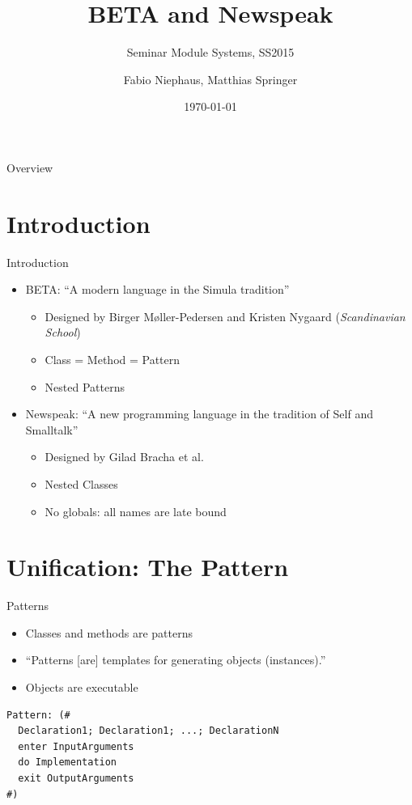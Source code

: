 \documentclass[xcolor=dvipsname,handout]{beamer} %
\title{BETA and Newspeak}
\subtitle{Seminar Module Systems, SS2015}
\author{Fabio Niephaus, Matthias Springer}
\date{\today}
\institute[2012]{Hasso Plattner Institute, Software Architecture Group}
\begin{document}
\begin{frame}[plain]
	\maketitle
\end{frame}
\begin{frame}{Overview}
	\tableofcontents[hideallsubsections]
\end{frame}


\section{Introduction}

\begin{frame}{Introduction}
\begin{itemize}
    \item BETA: ``A modern language in the Simula tradition''
    \begin{itemize}
      \item Designed by Birger Møller-Pedersen and Kristen Nygaard (\emph{Scandinavian School})
      \item Class = Method = Pattern
      \item Nested Patterns
    \end{itemize}
    \item Newspeak: ``A new programming language in the tradition of Self and Smalltalk''
    \begin{itemize}
      \item Designed by Gilad Bracha et al.
      \item Nested Classes
      \item No globals: all names are late bound
    \end{itemize}
\end{itemize}
\end{frame}

\section{Unification: The Pattern}

\begin{frame}[fragile]{Patterns}
\begin{itemize}
  \item Classes and methods are patterns
  \item ``Patterns [are] templates for generating objects (instances).''
  \item Objects are executable
\end{itemize}
\vfill
\begin{verbatim}
Pattern: (# 
  Declaration1; Declaration1; ...; DeclarationN
  enter InputArguments
  do Implementation
  exit OutputArguments
#)
\end{verbatim}
\end{frame}
\end{document}
